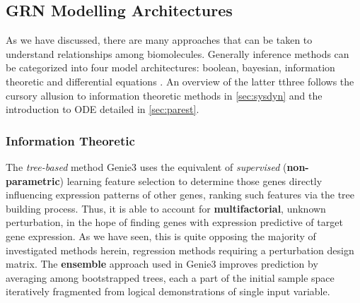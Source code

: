 \subsection{GRN Modelling Architectures}
\label{sec:models}
As we have discussed, there are many approaches that can be taken to understand relationships among biomolecules. Generally inference methods can be categorized into four model architectures: boolean, bayesian, information theoretic and differential equations \citep{HECKER200986}. An overview of the latter tthree follows the cursory allusion to information theoretic methods in \cref{sec:sysdyn} and the introduction to ODE detailed in \cref{sec:parest}.

\subsubsection{Information Theoretic}
\label{sec:info}
The \emph{tree-based} method Genie3 \citep{irrthum2010inferring} uses the equivalent of \emph{supervised} (\textbf{non-parametric}) learning feature selection to determine those genes directly influencing expression patterns of other genes, ranking such features via the tree building process. Thus, it is able to account for \textbf{multifactorial}, \ie unknown perturbation, in the hope of finding genes with expression predictive of target gene expression. As we have seen, this is quite opposing the majority of investigated methods herein, regression methods requiring a perturbation design matrix. The \textbf{ensemble} approach used in Genie3 improves prediction by averaging among bootstrapped trees, each a part of the initial sample space iteratively fragmented from logical demonstrations of single input variable.



